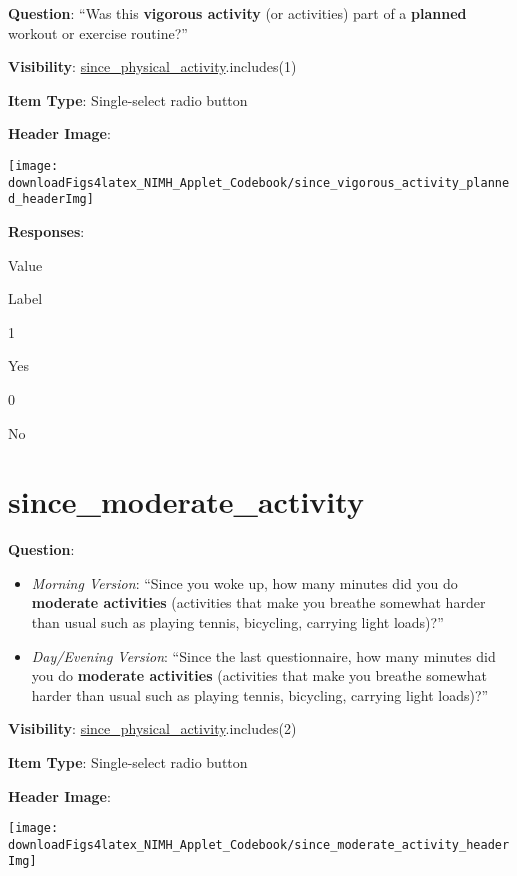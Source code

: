 \documentclass[]{book}
\providecommand{\tightlist}{%
  \setlength{\itemsep}{0pt}\setlength{\parskip}{0pt}}
\begin{document}
\textbf{Question}: ``Was this \textbf{vigorous activity} (or activities) part of a \textbf{planned} workout or exercise routine?''

\textbf{Visibility}: \protect\hyperlink{since_physical_activity}{since\_physical\_activity}.includes(1)

\textbf{Item Type}: Single-select radio button

\textbf{Header Image}:

\begin{flushleft}\texttt{[image: downloadFigs4latex\_NIMH\_Applet\_Codebook/since\_vigorous\_activity\_planned\_headerImg]} \end{flushleft}

\textbf{Responses}:

Value

Label

1

Yes

0

No

\hypertarget{since_moderate_activity}{%
\section{since\_moderate\_activity}\label{since_moderate_activity}}

\textbf{Question}:

\begin{itemize}
\tightlist
\item
  \emph{Morning Version}: ``Since you woke up, how many minutes did you do \textbf{moderate activities} (activities that make you breathe somewhat harder than usual such as playing tennis, bicycling, carrying light loads)?''
\item
  \emph{Day/Evening Version}: ``Since the last questionnaire, how many minutes did you do \textbf{moderate activities} (activities that make you breathe somewhat harder than usual such as playing tennis, bicycling, carrying light loads)?''
\end{itemize}

\textbf{Visibility}: \protect\hyperlink{since_physical_activity}{since\_physical\_activity}.includes(2)

\textbf{Item Type}: Single-select radio button

\textbf{Header Image}:

\begin{flushleft}\texttt{[image: downloadFigs4latex\_NIMH\_Applet\_Codebook/since\_moderate\_activity\_headerImg]} \end{flushleft}
\end{document}
